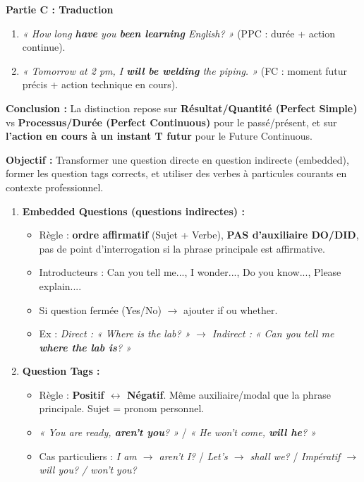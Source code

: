 \documentclass[11pt]{article}
\newcommand{\cle}[1]{{\popxbold\color{popdark}#1}}
\begin{document}
\begin{exoresolu}
\textbf{Partie C : Traduction}
\begin{enumerate}
    \item \emph{« How long \textbf{have} you \textbf{been learning} English? »} (PPC : durée + action continue).
    \item \emph{« Tomorrow at 2 pm, I \textbf{will be welding} the piping. »} (FC : moment futur précis + action technique en cours).
\end{enumerate}

\textbf{Conclusion :} La distinction repose sur \textbf{Résultat/Quantité (Perfect Simple)} vs \textbf{Processus/Durée (Perfect Continuous)} pour le passé/présent, et sur \textbf{l'action en cours à un instant T futur} pour le Future Continuous.
\end{exoresolu}

\begin{methode}
\textbf{Objectif :} Transformer une question directe en question indirecte (embedded), former les question tags corrects, et utiliser des verbes à particules courants en contexte professionnel.
\begin{enumerate}
    \item \textbf{Embedded Questions (questions indirectes) :}
    \begin{itemize}
        \item Règle : \textbf{ordre affirmatif} (Sujet + Verbe), \textbf{PAS d'auxiliaire DO/DID}, pas de point d'interrogation si la phrase principale est affirmative.
        \item Introducteurs : \cle{Can you tell me...}, \cle{I wonder...}, \cle{Do you know...}, \cle{Please explain...}.
        \item Si question fermée (Yes/No) $\rightarrow$ ajouter \cle{if} ou \cle{whether}.
        \item Ex : \emph{Direct : « Where is the lab? »} $\rightarrow$ \emph{Indirect : « Can you tell me \textbf{where the lab is}? »}
    \end{itemize}
    \item \textbf{Question Tags :}
    \begin{itemize}
        \item Règle : \textbf{Positif $\leftrightarrow$ Négatif}. Même auxiliaire/modal que la phrase principale. Sujet = pronom personnel.
        \item \emph{« You are ready, \textbf{aren't you}? »} / \emph{« He won't come, \textbf{will he}? »}
        \item Cas particuliers : \emph{I am $\rightarrow$ aren't I?} / \emph{Let's $\rightarrow$ shall we?} / \emph{Impératif $\rightarrow$ will you? / won't you?}

\end{itemize}
\end{enumerate}
\end{methode}
\end{document}
